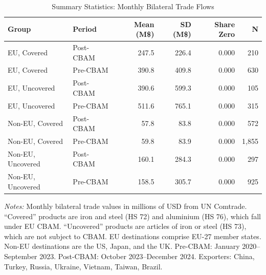 \begin{table}[htbp]
\centering
\caption{Summary Statistics: Monthly Bilateral Trade Flows}
\label{tab:summary}
\begin{tabular}{llrrrr}
\hline\hline
Group & Period & Mean (M\$) & SD (M\$) & Share Zero & N \\
\hline
EU, Covered & Post-CBAM & 247.5 & 226.4 & 0.000 & 210 \\
EU, Covered & Pre-CBAM & 390.8 & 409.8 & 0.000 & 630 \\
EU, Uncovered & Post-CBAM & 390.6 & 599.3 & 0.000 & 105 \\
EU, Uncovered & Pre-CBAM & 511.6 & 765.1 & 0.000 & 315 \\
Non-EU, Covered & Post-CBAM & 57.8 & 83.8 & 0.000 & 572 \\
Non-EU, Covered & Pre-CBAM & 59.8 & 83.9 & 0.000 & 1,855 \\
Non-EU, Uncovered & Post-CBAM & 160.1 & 284.3 & 0.000 & 297 \\
Non-EU, Uncovered & Pre-CBAM & 158.5 & 305.7 & 0.000 & 925 \\
\hline\hline
\end{tabular}
\begin{tablenotes}[flushleft]
\small
\item \textit{Notes:} Monthly bilateral trade values in millions of USD from UN Comtrade. ``Covered'' products are iron and steel (HS 72) and aluminium (HS 76), which fall under EU CBAM. ``Uncovered'' products are articles of iron or steel (HS 73), which are not subject to CBAM. EU destinations comprise EU-27 member states. Non-EU destinations are the US, Japan, and the UK. Pre-CBAM: January 2020--September 2023. Post-CBAM: October 2023--December 2024. Exporters: China, Turkey, Russia, Ukraine, Vietnam, Taiwan, Brazil.
\end{tablenotes}
\end{table}
